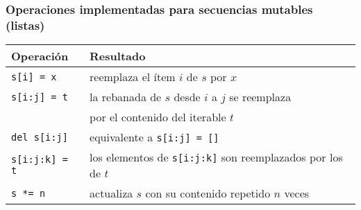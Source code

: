 \documentclass{beamer}
\begin{document}
\begin{frame}[fragile]
    \frametitle{Operaciones implementadas para secuencias mutables (listas)}
{\small
    \begin{table}[]
    \begin{tabular}{@{}ll@{}}
    \toprule
    \textbf{Operación}    & \textbf{Resultado}                                                                          \\ \midrule
    \texttt{s[i] = x}              & reemplaza el ítem $i$ de $s$ por $x$                                                             \\
    \texttt{s[i:j] = t}            & la rebanada de $s$ desde $i$ a $j$ se reemplaza \\ & por el contenido del iterable $t$                     \\ 
    \texttt{del s[i:j]}            & equivalente a \texttt{s[i:j] = []}                                                              \\ 
    \texttt{s[i:j:k] = t}          & los elementos de \texttt{s[i:j:k]} son reemplazados por los de $t$                                  \\
    \texttt{s *= n}                & actualiza $s$ con su contenido repetido $n$ veces                                             \\
    \end{tabular}
    \end{table}
}  

\end{frame}
\end{document}
